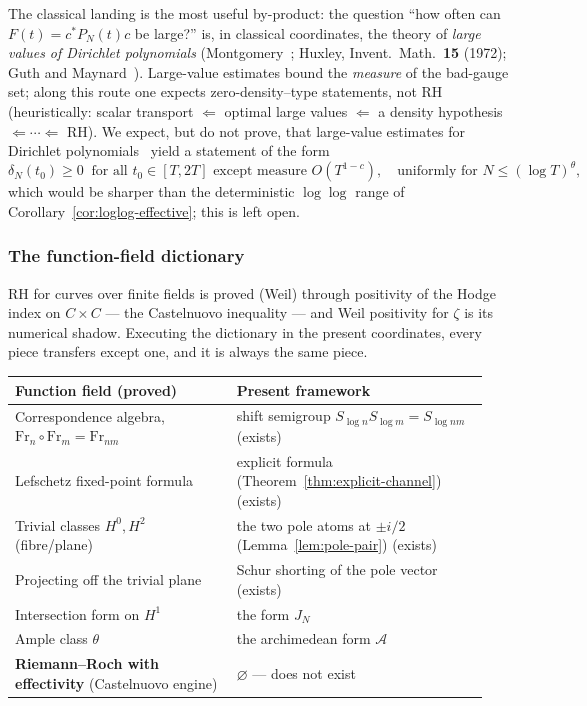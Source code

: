 \documentclass[11pt]{amsart}
\theoremstyle{definition}
\theoremstyle{remark}
\theoremstyle{definition}
\begin{document}
The classical landing is the most useful by-product: the question ``how often can
$F(t)=c^*P_N(t)c$ be large?'' is, in classical coordinates, the theory of \emph{large values of
Dirichlet polynomials} (Montgomery~\cite{MontgomeryTopics}; Huxley, Invent.\ Math.\ \textbf{15} (1972); Guth and
Maynard~\cite{GuthMaynard}).  Large-value estimates bound the \emph{measure} of the bad-gauge set;
along this route one expects zero-density--type statements, not RH (heuristically: scalar transport
$\Longleftarrow$ optimal large values $\Longleftarrow$ a density hypothesis
$\Longleftarrow\cdots\Longleftarrow$ RH).  We expect, but do not prove, that large-value estimates for
Dirichlet polynomials~\cite{GuthMaynard} yield a statement of the form
\[
   \delta_N(t_0)\ge0\ \text{ for all }t_0\in[T,2T]\text{ except measure }O(T^{1-c}),\quad
   \text{uniformly for }N\le(\log T)^\theta,
\]
which would be sharper than the deterministic $\log\log$ range of
Corollary~\ref{cor:loglog-effective}; this is left open.

\subsubsection*{The function-field dictionary}

RH for curves over finite fields is proved (Weil) through positivity of the Hodge index on
$C\times C$ --- the Castelnuovo inequality --- and Weil positivity for $\zeta$ is its numerical shadow.
Executing the dictionary in the present coordinates, every piece transfers except one, and it is always
the same piece.

\begin{center}\small
\begin{tabular}{@{}p{0.44\linewidth}p{0.5\linewidth}@{}}
\toprule
Function field (proved) & Present framework \\
\midrule
Correspondence algebra, $\mathrm{Fr}_n\circ\mathrm{Fr}_m=\mathrm{Fr}_{nm}$ & shift semigroup
$S_{\log n}S_{\log m}=S_{\log nm}$ \; (exists) \\
Lefschetz fixed-point formula & explicit formula (Theorem~\ref{thm:explicit-channel}) \; (exists) \\
Trivial classes $H^0,H^2$ (fibre/plane) & the two pole atoms at $\pm i/2$ (Lemma~\ref{lem:pole-pair})
\; (exists) \\
Projecting off the trivial plane & Schur shorting of the pole vector \; (exists) \\
Intersection form on $H^1$ & the form $J_N$ \\
Ample class $\theta$ & the archimedean form $\mathcal A$ \\
\textbf{Riemann--Roch with effectivity} (Castelnuovo engine) & $\varnothing$ --- does not exist \\
\bottomrule
\end{tabular}
\end{center}
\end{document}
